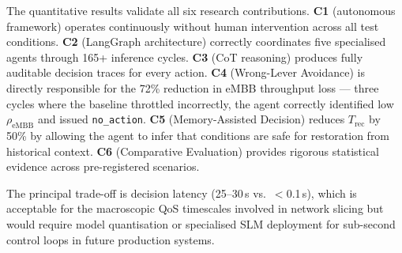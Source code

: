 The quantitative results validate all six research contributions. \textbf{C1} (autonomous framework) operates continuously without human intervention across all test conditions. \textbf{C2} (LangGraph architecture) correctly coordinates five specialised agents through 165+ inference cycles. \textbf{C3} (CoT reasoning) produces fully auditable decision traces for every action. \textbf{C4} (Wrong-Lever Avoidance) is directly responsible for the 72\% reduction in eMBB throughput loss — three cycles where the baseline throttled incorrectly, the agent correctly identified low $\rho_{\text{eMBB}}$ and issued \texttt{no\_action}. \textbf{C5} (Memory-Assisted Decision) reduces $T_{\text{rec}}$ by 50\% by allowing the agent to infer that conditions are safe for restoration from historical context. \textbf{C6} (Comparative Evaluation) provides rigorous statistical evidence across pre-registered scenarios.

The principal trade-off is decision latency (25--30\,s vs.\ $<$0.1\,s), which is acceptable for the macroscopic QoS timescales involved in network slicing but would require model quantisation or specialised SLM deployment for sub-second control loops in future production systems.
